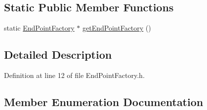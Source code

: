 \subsection*{Static Public Member Functions}
\begin{DoxyCompactItemize}
\item 
static \hyperlink{classipc_1_1EndPointFactory}{End\+Point\+Factory} $\ast$ \hyperlink{classipc_1_1EndPointFactory_a73f3fb990f682beeff892b65cf91a35b}{get\+End\+Point\+Factory} ()
\end{DoxyCompactItemize}


\subsection{Detailed Description}


Definition at line 12 of file End\+Point\+Factory.\+h.



\subsection{Member Enumeration Documentation}
